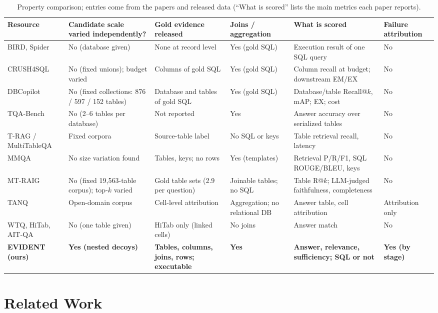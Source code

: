 \documentclass[11pt]{article}
\newcommand{\benchmark}{\mbox{EVIDENT}}  %
\begin{document}
\begin{table}[t]\centering\footnotesize\setlength{\tabcolsep}{3pt}
\begin{tabular}{R{1.9cm}R{3.0cm}R{2.9cm}R{2.2cm}R{3.3cm}R{1.4cm}}\toprule
Resource & Candidate scale varied independently? & Gold evidence released & Joins / aggregation & What is scored & Failure attribution\\\midrule
BIRD, Spider & No (database given) & None at record level & Yes (gold SQL) & Execution result of one SQL query & No\\
CRUSH4SQL & No (fixed unions); budget varied & Columns of gold SQL & Yes (gold SQL) & Column recall at budget; downstream EM/EX & No\\
DBCopilot & No (fixed collections: 876 / 597 / 152 tables) & Database and tables of gold SQL & Yes (gold SQL) & Database/table Recall@$k$, mAP; EX; cost & No\\
TQA-Bench & No (2--6 tables per database) & Not reported & Yes & Answer accuracy over serialized tables & No\\
T-RAG / MultiTableQA & Fixed corpora & Source-table label & No SQL or keys & Table retrieval recall, latency & No\\
MMQA & No size variation found & Tables, keys; no rows & Yes (templates) & Retrieval P/R/F1, SQL ROUGE/BLEU, keys & No\\
MT-RAIG & No (fixed 19{,}563-table corpus); top-$k$ varied & Gold table sets (2.9 per question) & Joinable tables; no SQL & Table R@$k$; LLM-judged faithfulness, completeness & No\\
TANQ & Open-domain corpus & Cell-level attribution & Aggregation; no relational DB & Answer table, cell attribution & Attribution only\\
WTQ, HiTab, AIT-QA & No (one table given) & HiTab only (linked cells) & No joins & Answer match & No\\
\midrule
\textbf{\benchmark{} (ours)} & \textbf{Yes (nested decoys)} & \textbf{Tables, columns, joins, rows; executable} & \textbf{Yes} & \textbf{Answer, relevance, sufficiency; SQL or not} & \textbf{Yes (by stage)}\\\bottomrule
\end{tabular}
\caption{Property comparison; entries come from the papers and released data (``What is scored'' lists the main metrics each paper reports).}\label{tab:coverage}
\end{table}

\section{Related Work}\label{sec:related}
\end{document}

